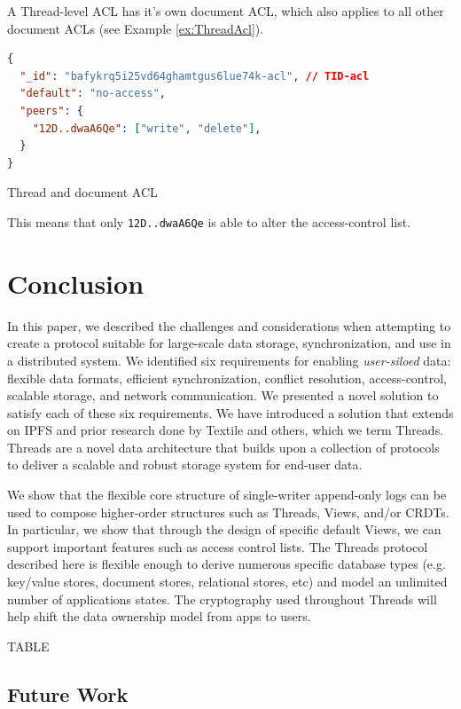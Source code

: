 \documentclass{textile}
\begin{document}
 A Thread-level ACL has it's own document ACL, which also applies to all other document ACLs (see Example \ref{ex:ThreadAcl}).

\begin{example}
\begin{lstlisting}[language=json,firstnumber=1]
{
  "_id": "bafykrq5i25vd64ghamtgus6lue74k-acl", // TID-acl
  "default": "no-access",
  "peers": {
    "12D..dwaA6Qe": ["write", "delete"],
  }
}
\end{lstlisting}
\caption{Thread and document ACL}
\label{ex:ThreadAcl}
\end{example} 

This means that only \texttt{12D..dwaA6Qe} is able to alter the access-control list.

\section{Conclusion}

In this paper, we described the challenges and considerations when attempting to create a protocol suitable for large-scale data storage, synchronization, and use in a distributed system. We identified six requirements for enabling \emph{user-siloed} data: flexible data formats, efficient synchronization, conflict resolution, access-control, scalable storage, and network communication. We presented a novel solution to satisfy each of these six requirements. We have introduced a solution that extends on IPFS and prior research done by Textile and others, which we term Threads. Threads are a novel data architecture that builds upon a collection of protocols to deliver a scalable and robust storage system for end-user data. 

We show that the flexible core structure of single-writer append-only logs can be used to compose higher-order structures such as Threads, Views, and/or CRDTs. In particular, we show that through the design of specific default Views, we can support important features such as access control lists. The Threads protocol described here is flexible enough to derive numerous specific database types (e.g. key/value stores, document stores, relational stores, etc) and model an unlimited number of applications states. The cryptography used throughout Threads will help shift the data ownership model from apps to users. 

TABLE

\subsection{Future Work}
\end{document}
